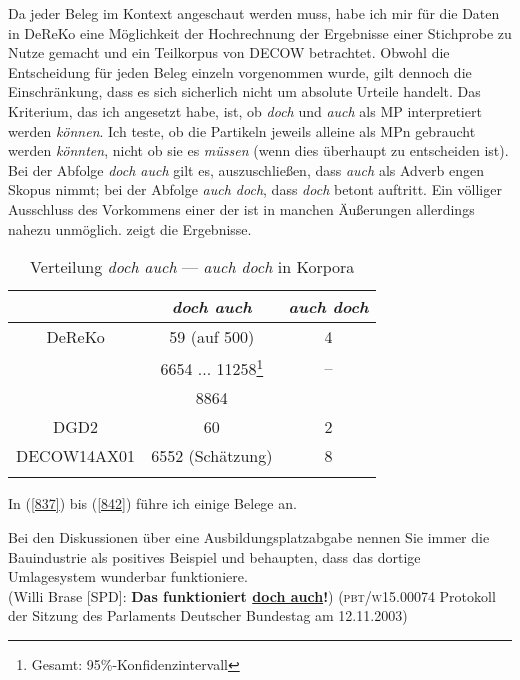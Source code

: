 {Da jeder Beleg im Kontext angeschaut werden muss, habe ich mir für die Daten in DeReKo eine Möglichkeit der Hochrechnung der Ergebnisse einer Stichprobe zu Nutze gemacht und  ein Teilkorpus von DECOW betrachtet. Obwohl die Entscheidung für jeden Beleg einzeln vorgenommen wurde, gilt dennoch die Einschränkung, dass es sich sicherlich nicht um absolute Urteile handelt. Das Kriterium, das ich angesetzt habe, ist, ob \textit{doch} und \textit{auch} als MP interpretiert werden \emph{können}. Ich teste, ob die Partikeln jeweils alleine als MPn gebraucht werden \emph{könnten}, nicht ob sie es \emph{müssen} (wenn dies überhaupt zu entscheiden ist). Bei der Abfolge \textit{doch auch} gilt es, auszuschließen, dass \textit{auch} als Adverb  engen Skopus nimmt; bei der Abfolge \textit{auch doch}, dass \textit{doch} betont auftritt. Ein völliger Ausschluss des Vorkommens einer der  ist in manchen Äußerungen allerdings nahezu unmöglich.  zeigt die Ergebnisse.

\begin{table}[b]
	\caption{\label{tab:836}Verteilung \textit{doch auch} --- \textit{auch doch} in Korpora}
	\begin{tabular}[t]{ccc}
	\lsptoprule
	& \textit{doch auch} & \textit{auch doch}\\
	\midrule
	DeReKo & 59 (auf 500) & 4\\
	& 6654 ... 11258\footnote{Gesamt: 95\%-Konfidenzintervall} & --\\
	& 8864 & \\
	DGD2 & 60 & 2\\
	DECOW14AX01 & 6552 (Schätzung) & 8\\
	\lspbottomrule				 
    \end{tabular}    
\end{table}\pagebreak


In (\ref{837}) bis (\ref{842}) führe ich einige Belege an.

\begin{exe}
	\ex\label{837}
% 
	Bei den Diskussionen über eine Ausbildungsplatzabgabe nennen Sie immer die Bauindustrie als positives Beispiel und behaupten, dass das dortige 				Umlagesystem wunderbar funktioniere.\\
	(Willi Brase [SPD]: \textbf{Das funktioniert \ul{doch auch}!})
	\newline
	(\textsc{pbt/w15.00074} Protokoll der Sitzung des Parlaments Deutscher Bundestag am 12.11.2003)
\end{exe}

}
